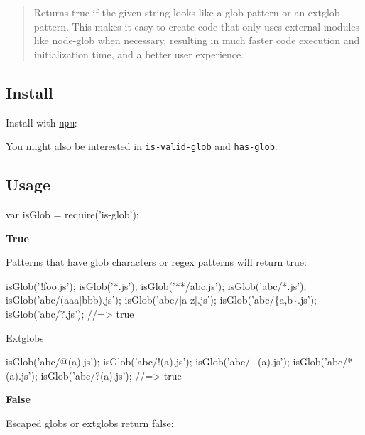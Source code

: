 \begin{quote}
Returns {\ttfamily true} if the given string looks like a glob pattern or an extglob pattern. This makes it easy to create code that only uses external modules like node-\/glob when necessary, resulting in much faster code execution and initialization time, and a better user experience. \end{quote}


\subsection*{Install}

Install with \href{https://www.npmjs.com/}{\tt npm}\+:




You might also be interested in \href{https://github.com/jonschlinkert/is-valid-glob}{\tt is-\/valid-\/glob} and \href{https://github.com/jonschlinkert/has-glob}{\tt has-\/glob}.

\subsection*{Usage}


\begin{DoxyCode}
var isGlob = require('is-glob');
\end{DoxyCode}


{\bfseries True}

Patterns that have glob characters or regex patterns will return {\ttfamily true}\+:


\begin{DoxyCode}
isGlob('!foo.js');
isGlob('*.js');
isGlob('**/abc.js');
isGlob('abc/*.js');
isGlob('abc/(aaa|bbb).js');
isGlob('abc/[a-z].js');
isGlob('abc/\{a,b\}.js');
isGlob('abc/?.js');
//=> true
\end{DoxyCode}


Extglobs


\begin{DoxyCode}
isGlob('abc/@(a).js');
isGlob('abc/!(a).js');
isGlob('abc/+(a).js');
isGlob('abc/*(a).js');
isGlob('abc/?(a).js');
//=> true
\end{DoxyCode}


{\bfseries False}

Escaped globs or extglobs return {\ttfamily false}\+:


